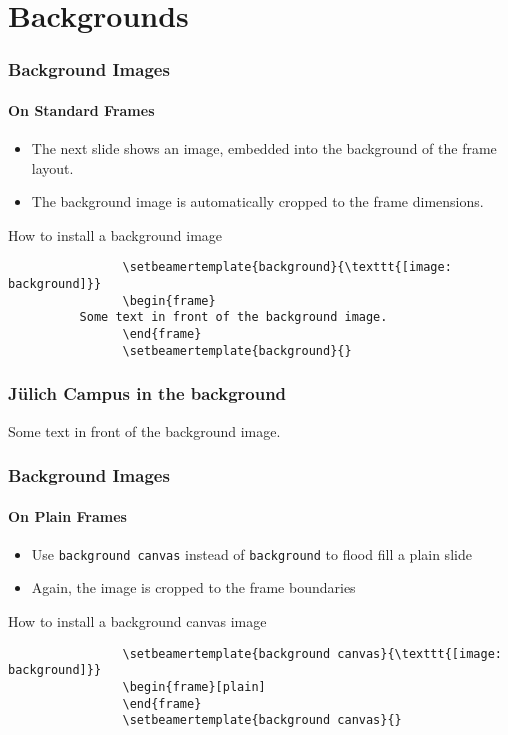 \newenvironment{fragileframe}%
  {\begin{frame}[fragile,environment=fragileframe]}%
  {\end{frame}}

\section{Backgrounds}
\begin{fragileframe}
        \frametitle{Background Images}
        \framesubtitle{On Standard Frames}
        \begin{itemize}
      \item The next slide shows an image, embedded into the background of the frame layout.
      \item The background image is automatically cropped to the frame dimensions.
    \end{itemize}
        \begin{block}{How to install a background image}
        \tiny
        \begin{verbatim}
                \setbeamertemplate{background}{\texttt{[image: background]}}
                \begin{frame}
          Some text in front of the background image.
                \end{frame}
                \setbeamertemplate{background}{}
        \end{verbatim}
        \end{block}
\end{fragileframe}

\begin{frame}
        \frametitle{Jülich Campus in the background}
        \vspace{5em}
        \centering
        \colorbox{fzjviolet}{\textcolor{fzjlightblue}{Some text in front of the background image.}}
\end{frame}

\begin{fragileframe}
        \frametitle{Background Images}
        \framesubtitle{On Plain Frames}
        \begin{itemize}
          \item Use \verb!background canvas! instead of \verb!background! to flood fill a plain slide
          \item Again, the image is cropped to the frame boundaries
        \end{itemize}
        \begin{block}{How to install a background canvas image}
        \tiny
        \begin{verbatim}
                \setbeamertemplate{background canvas}{\texttt{[image: background]}}
                \begin{frame}[plain]
                \end{frame}
                \setbeamertemplate{background canvas}{}
        \end{verbatim}
        \end{block}
\end{fragileframe}

